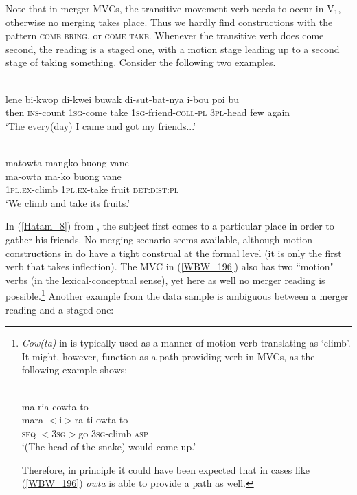 Note that in merger MVCs, the transitive movement verb needs to occur in V$_1$, otherwise no merging takes place. Thus we hardly find constructions with the pattern \textsc{come} \textsc{bring}, or \textsc{come} \textsc{take}. Whenever the transitive verb does come second, the reading is a staged one, with a motion stage leading up to a second stage of taking something. Consider the following two examples.

\ea \label{Hatam_8}
\\
\gll lene bi-kwop di-kwei buwak di-sut-bat-nya i-bou poi bu \\
then \textsc{ins}-count 1\textsc{sg}-come take 1\textsc{sg}-friend-\textsc{coll}-\textsc{pl} 3\textsc{pl}-head few again \\
\glft `The every(day) I came and got my friends...' \\ 
\z

\ea \label{WBW_196} 
\\
\glll matowta mangko buong vane \\
ma-owta ma-ko buong vane \\
1\textsc{pl}.\textsc{ex}-climb 1\textsc{pl}.\textsc{ex}-take fruit \textsc{det}:\textsc{dist}:\textsc{pl}\\
\glft `We climb and take its fruits.' \\ 
\z

\largerpage[1.5]
In (\ref{Hatam_8}) from , the subject first comes to a particular place in order to gather his friends. No merging scenario seems available, although motion constructions in  do have a tight construal at the formal level (it is only the first verb that takes inflection). The  MVC in (\ref{WBW_196}) also has two ``motion" verbs (in the lexical-conceptual sense), yet here as well no merger reading is possible.\footnote{\textit{Cow(ta)} in  is typically used as a manner of motion verb translating as `climb'. It might, however, function as a path-providing verb in MVCs, as the following example shows:

\ea 
{}\\
\glll ma ria cowta to \\
mara $<$i$>$ra ti-owta to \\
\textsc{seq} $<$3\textsc{sg}$>$go 3\textsc{sg}-climb \textsc{asp}\\
\glft `(The head of the snake) would come up.'\\ 
\z

Therefore, in principle it could have been expected that in cases like (\ref{WBW_196}) \textit{owta} is able to provide a path as well.} Another example from the data sample is ambiguous between a merger reading and a staged one:
 
